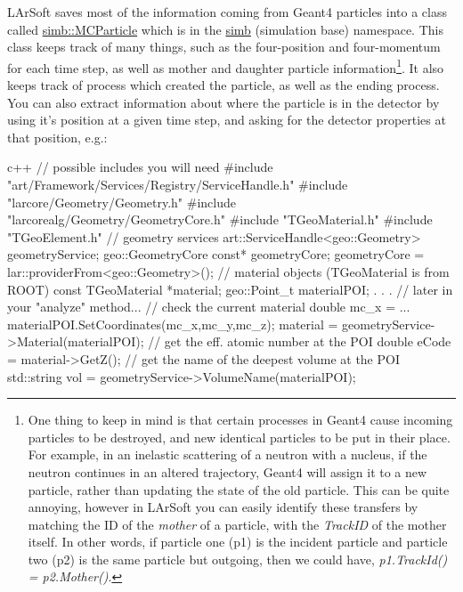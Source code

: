 \documentclass[8pt]{refart}
\begin{document}
LArSoft saves most of the information coming from Geant4 particles into a class called \href{https://internal.dunescience.org/doxygen/classsimb_1_1MCParticle.html}{simb::MCParticle} which is in the \href{https://internal.dunescience.org/doxygen/namespacesimb.html}{simb} (simulation base) namespace.  This class keeps track of many things, such as the four-position and four-momentum for each time step, as well as mother and daughter particle information\footnote{One thing to keep in mind is that certain processes in Geant4 cause incoming particles to be destroyed, and new identical particles to be put in their place.  For example, in an inelastic scattering of a neutron with a nucleus, if the neutron continues in an altered trajectory, Geant4 will assign it to a new particle, rather than updating the state of the old particle.  This can be quite annoying, however in LArSoft you can easily identify these transfers by matching the ID of the \textit{mother} of a particle, with the \textit{TrackID} of the mother itself. In other words, if particle one (p1) is the incident particle and particle two (p2) is the same particle but outgoing, then we could have, \textit{p1.TrackId() = p2.Mother()}.}.  It also keeps track of process which created the particle, as well as the ending process.  You can also extract information about where the particle is in the detector by using it's position at a given time step, and asking for the detector properties at that position, e.g.:
\begin{code}{c++}
// possible includes you will need
#include "art/Framework/Services/Registry/ServiceHandle.h"
#include "larcore/Geometry/Geometry.h"
#include "larcorealg/Geometry/GeometryCore.h"
#include "TGeoMaterial.h"
#include "TGeoElement.h"
// geometry services
art::ServiceHandle<geo::Geometry> geometryService;
geo::GeometryCore const* geometryCore;
geometryCore = lar::providerFrom<geo::Geometry>();
// material objects (TGeoMaterial is from ROOT)
const TGeoMaterial *material;
geo::Point_t materialPOI;
.
.
.
// later in your "analyze" method...
// check the current material
double mc_x = ...
materialPOI.SetCoordinates(mc_x,mc_y,mc_z);
material = geometryService->Material(materialPOI);
// get the eff. atomic number at the POI
double eCode = material->GetZ();
// get the name of the deepest volume at the POI
std::string vol = geometryService->VolumeName(materialPOI);
\end{code}
\end{document}
